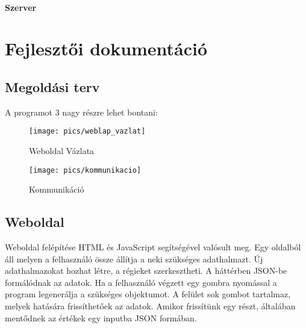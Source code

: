 \documentclass{elteikthesis}
\begin{document}
\subsubsection{Szerver}

\chapter{Fejlesztői dokumentáció}
\begin{comment}
A Fejlesztői dokumentáció tartalmazza
- a probléma részletes specifikációját,
- a felhasznált módszerek részletes leírását, a használt fogalmak definícióját,
- a program logikai és fizikai szerkezetének leírását (adatszerkezetek, adatbázisok,
modulfelbontás),
- a tesztelési tervet és a tesztelés eredményeit.
\end{comment}

\section{Megoldási terv}
A programot 3 nagy részre lehet bontani: 

\begin{figure}[h]
\texttt{[image: pics/weblap\_vazlat]}
\centering
\caption{Weboldal Vázlata}
\end{figure}

\begin{figure}[h]
\texttt{[image: pics/kommunikacio]}
\centering
\caption{Kommunikáció}
\end{figure}

\section{Weboldal}
Weboldal felépítése HTML és JavaScript segítségével valósult meg. Egy oldalból áll melyen a felhasználó össze állítja a neki szükséges adathalmazt. Új adathalmazokat hozhat létre, a régieket szerkesztheti. A háttérben JSON-be formálódnak az adatok.
Ha a felhasználó végzett egy gombra nyomással a program legenerálja a szükséges objektumot. \newline
A felület sok gombot tartalmaz, melyek hatására frissíthetőek az adatok. Amikor frissítünk egy részt, általában mentődnek az értékek egy inputba JSON formában.
\end{document}
